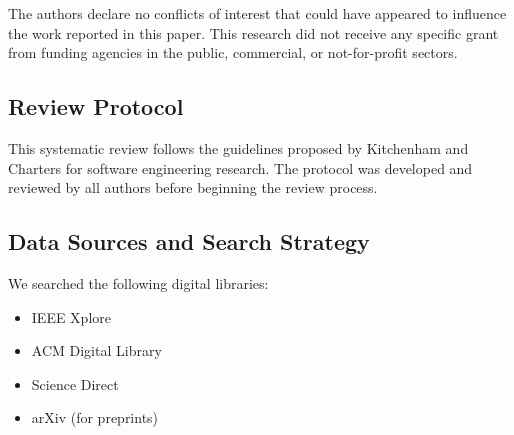 The authors declare no conflicts of interest that could have appeared to influence the work reported in this paper. This research did not receive any specific grant from funding agencies in the public, commercial, or not-for-profit sectors.





\subsection{Review Protocol}
This systematic review follows the guidelines proposed by Kitchenham and Charters for software engineering research. The protocol was developed and reviewed by all authors before beginning the review process.

\subsection{Data Sources and Search Strategy}
We searched the following digital libraries:
\begin{itemize}
    \item IEEE Xplore
    \item ACM Digital Library
    \item Science Direct
    \item arXiv (for preprints)
\end{itemize}


